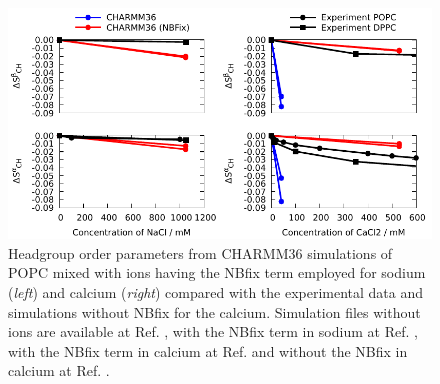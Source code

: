 \documentclass[journal=jpcbfk]{achemso}
\begin{document}
\begin{figure}[]
  \centering
  \includegraphics[width=17.0cm]{../Figs/OP_CHARMM_CaCl_POPC_NBFix.pdf}
  \caption{\label{OP_CHARMM_CaCl_POPC_NBFix}
    Headgroup order parameters from CHARMM36 simulations of POPC mixed with ions having
    the NBfix term employed for sodium \cite{venable13} ({\it left})
    and calcium \cite{kim16} ({\it right}) compared with the experimental data \cite{akutsu81,altenbach84}
    and simulations without NBfix for the calcium.
    Simulation files without ions are available at Ref. ,
    with the NBfix term in sodium at Ref. , 
    with the NBfix term in calcium at Ref.  and
    without the NBfix in calcium at Ref. .
  }
\end{figure}
\end{document}
